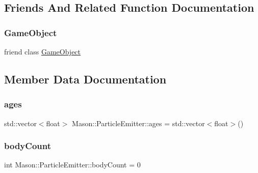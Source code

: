 \subsection{Friends And Related Function Documentation}
\hypertarget{class_mason_1_1_particle_emitter_a00df87c957d8f7ee0fc51f07a0542f4a}{}\label{class_mason_1_1_particle_emitter_a00df87c957d8f7ee0fc51f07a0542f4a} 
\subsubsection{\texorpdfstring{Game\+Object}{GameObject}}
{\footnotesize\ttfamily friend class \hyperlink{class_mason_1_1_game_object}{Game\+Object}\hspace{0.3cm}{\ttfamily [friend]}}



\subsection{Member Data Documentation}
\hypertarget{class_mason_1_1_particle_emitter_a00b9492ad2e49d6f95e05ea7c4052a57}{}\label{class_mason_1_1_particle_emitter_a00b9492ad2e49d6f95e05ea7c4052a57} 
\subsubsection{\texorpdfstring{ages}{ages}}
{\footnotesize\ttfamily std\+::vector$<$float$>$ Mason\+::\+Particle\+Emitter\+::ages = std\+::vector$<$float$>$()\hspace{0.3cm}{\ttfamily [protected]}}

\hypertarget{class_mason_1_1_particle_emitter_a76a3eb861adfec2123479be32c66999c}{}\label{class_mason_1_1_particle_emitter_a76a3eb861adfec2123479be32c66999c} 
\subsubsection{\texorpdfstring{body\+Count}{bodyCount}}
{\footnotesize\ttfamily int Mason\+::\+Particle\+Emitter\+::body\+Count = 0\hspace{0.3cm}{\ttfamily [protected]}}


